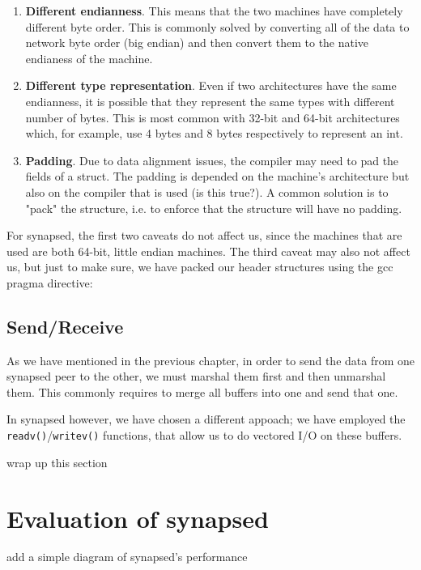 \begin{enumerate}
	\item \textbf{Different endianness}. This means that the two machines have 
		completely different byte order. This is commonly solved by converting 
		all of the data to network byte order (big endian) and then convert 
		them to the native endianess of the machine.
	\item \textbf{Different type representation}. Even if two architectures 
		have the same endianness, it is possible that they represent the same 
		types with different number of bytes. This is most common with 32-bit 
		and 64-bit architectures which, for example, use 4 bytes and 8 bytes 
		respectively to represent an int.
	\item \textbf{Padding}. Due to data alignment issues, the compiler may need 
		to pad the fields of a struct. The padding is depended on the machine's 
		architecture but also on the compiler that is used (\fixme is this 
		true?).  A common solution is to "pack" the structure, i.e. to enforce 
		that the structure will have no padding.
\end{enumerate}

For synapsed, the first two caveats do not affect us, since the machines that 
are used are both 64-bit, little endian machines. The third caveat may also not 
affect us, but just to make sure, we have packed our header structures using 
the gcc pragma directive:


\subsection{Send/Receive}

As we have mentioned in the previous chapter, in order to send the data from 
one synapsed peer to the other, we must marshal them first and then unmarshal 
them. This commonly requires to merge all buffers into one and send that one.  

In synapsed however, we have chosen a different appoach; we have employed the 
\texttt{readv()}/\texttt{writev()} functions, that allow us to do vectored I/O 
on these buffers.

\todo wrap up this section

\section{Evaluation of synapsed}

\todo add a simple diagram of synapsed's performance
